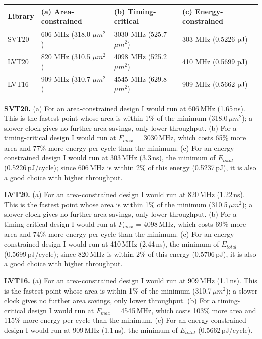 \documentclass[11pt]{article}
\begin{document}
\begin{center}
\small
\begin{tabular}{l|l|l|l}
\hline
Library & (a) Area-constrained & (b) Timing-critical & (c) Energy-constrained \\
\hline
SVT20 & 606 MHz (318.0 $\mu m^2$) & 3030 MHz (525.7 $\mu m^2$) & 303 MHz (0.5226 pJ) \\
LVT20 & 820 MHz (310.5 $\mu m^2$) & 4098 MHz (525.2 $\mu m^2$) & 410 MHz (0.5699 pJ) \\
LVT16 & 909 MHz (310.7 $\mu m^2$) & 4545 MHz (629.8 $\mu m^2$) & 909 MHz (0.5662 pJ) \\
\hline
\end{tabular}
\end{center}
\textbf{SVT20.} (a) For an area-constrained design I would run at 606\,MHz (1.65\,ns). This is the fastest point whose area is within 1\% of the minimum (318.0\,$\mu m^2$); a slower clock gives no further area savings, only lower throughput. (b) For a timing-critical design I would run at $F_{max}$ = 3030\,MHz, which costs 65\% more area and 77\% more energy per cycle than the minimum. (c) For an energy-constrained design I would run at 303\,MHz (3.3\,ns), the minimum of $E_{total}$ (0.5226\,pJ/cycle); since 606\,MHz is within 2\% of this energy (0.5237\,pJ), it is also a good choice with higher throughput.

\textbf{LVT20.} (a) For an area-constrained design I would run at 820\,MHz (1.22\,ns). This is the fastest point whose area is within 1\% of the minimum (310.5\,$\mu m^2$); a slower clock gives no further area savings, only lower throughput. (b) For a timing-critical design I would run at $F_{max}$ = 4098\,MHz, which costs 69\% more area and 74\% more energy per cycle than the minimum. (c) For an energy-constrained design I would run at 410\,MHz (2.44\,ns), the minimum of $E_{total}$ (0.5699\,pJ/cycle); since 820\,MHz is within 2\% of this energy (0.5706\,pJ), it is also a good choice with higher throughput.

\textbf{LVT16.} (a) For an area-constrained design I would run at 909\,MHz (1.1\,ns). This is the fastest point whose area is within 1\% of the minimum (310.7\,$\mu m^2$); a slower clock gives no further area savings, only lower throughput. (b) For a timing-critical design I would run at $F_{max}$ = 4545\,MHz, which costs 103\% more area and 115\% more energy per cycle than the minimum. (c) For an energy-constrained design I would run at 909\,MHz (1.1\,ns), the minimum of $E_{total}$ (0.5662\,pJ/cycle).
\end{document}
